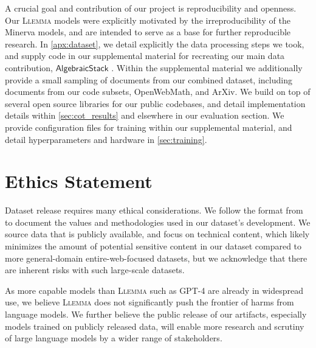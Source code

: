 A crucial goal and contribution of our project is reproducibility and openness. Our \textsc{Llemma} models were explicitly motivated by the irreproducibility of the Minerva models, and are intended to serve as a base for further reproducible research. In \autoref{apx:dataset}, we detail explicitly the data processing steps we took, and supply code in our supplemental material for recreating our main data contribution, $\mathsf{AlgebraicStack}$ . Within the supplemental material we additionally provide a small sampling of documents from our combined dataset, including documents from our code subsets, OpenWebMath, and ArXiv. We build on top of several open source libraries \citep{gpt-neox-library, eval-harness} for our public codebases, and detail implementation details within \autoref{sec:cot_results} and elsewhere in our evaluation section. We provide configuration files for training within our supplemental material, and detail hyperparameters and hardware in \autoref{sec:training}.

\section*{Ethics Statement}

Dataset release requires many ethical considerations. We follow the format from \citet{gebru2021datasheets} to document the values and methodologies used in our dataset's development. We source data that is publicly available, and focus on technical content, which likely minimizes the amount of potential sensitive content in our dataset compared to more general-domain entire-web-focused datasets, but we acknowledge that there are inherent risks with such large-scale datasets.

As more capable models than \textsc{Llemma} such as GPT-4 are already in widespread use, we believe \textsc{Llemma} does not significantly push the frontier of harms from language models. We further believe the public release of our artifacts, especially models trained on publicly released data, will enable more research and scrutiny of large language models by a wider range of stakeholders. 
\fi 



